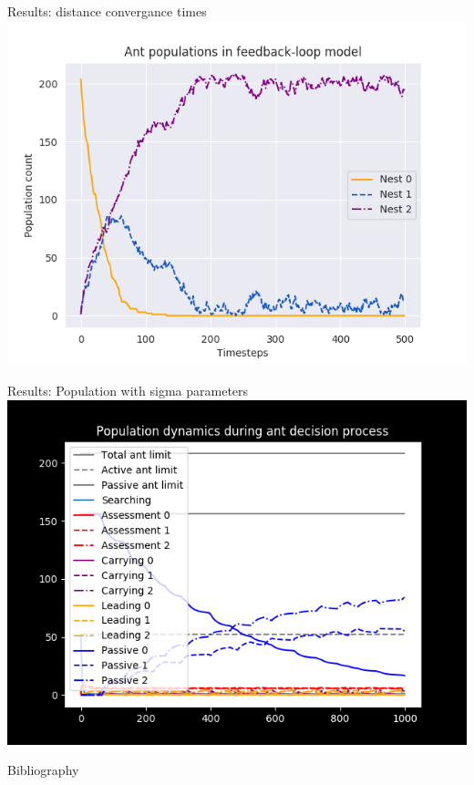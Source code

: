 \documentclass{beamer}
\begin{document}
\begin{frame}{Results: distance convergance times}
    \includegraphics[scale=0.7]{agent_based_population_model}
\end{frame}

\begin{frame}{Results: Population with sigma parameters}
    \includegraphics[scale=0.7]{populations}
\end{frame}

  \begin{frame}{Bibliography}
      
  \end{frame}
\end{document}
